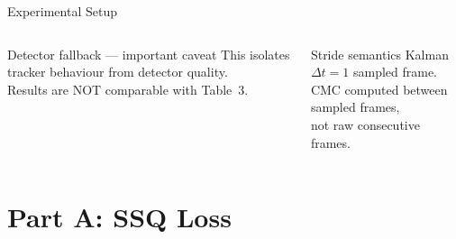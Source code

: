 \documentclass[aspectratio=169, 10pt]{beamer}
\newcommand{\red}[1]{\textcolor{honest}{#1}}
\begin{document}
\begin{frame}{Experimental Setup}
\begin{columns}[T]
\begin{alertblock}{Detector fallback — important caveat}
      \vspace{0.5em}
      This isolates tracker behaviour from detector quality.\\
      \red{Results are NOT comparable with Table~3.}
    \end{alertblock}

    \vspace{0.5em}
    \begin{block}{Stride semantics}
      Kalman $\Delta t = 1$ sampled frame.\\
      CMC computed between sampled frames,\\
      not raw consecutive frames.
    \end{block}

  \end{columns}
\end{frame}

\section{Part A: SSQ Loss}
\end{document}

